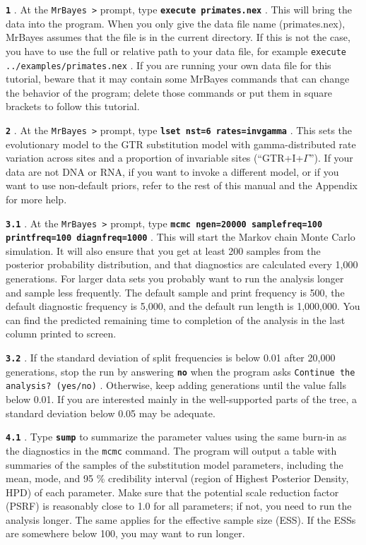 \documentclass[12pt]{book}
\newcommand{\ttt}[1]{\texttt{#1} }
\newcommand{\tb}[1]{\ttt{\textbf{#1}} }
\begin{document}
\tb{1}. At the \ttt{MrBayes >} prompt, type \tb{execute primates.nex}. This will bring
the data into the program. When you only give the data file name (primates.nex), MrBayes assumes
that the file is in the current directory. If this is not the case, you have to use the full or
relative path to your data file, for example \ttt{execute ../examples/primates.nex}. If you are
running your own data file for this tutorial, beware that it may contain some MrBayes commands that
can change the behavior of the program; delete those commands or put them in square brackets to
follow this tutorial. 

\tb{2}. At the \ttt{MrBayes >} prompt, type \tb{lset nst=6 rates=invgamma}. This sets
the evolutionary model to the GTR substitution model with gamma-distributed rate variation across
sites and a proportion of invariable sites (``GTR+I+$\Gamma$''). If your data are not DNA or RNA, if
you want to invoke a different model, or if you want to use non-default priors, refer to the rest
of this manual and the Appendix for more help.

\tb{3.1}. At the \ttt{MrBayes >} prompt, type \tb{mcmc ngen=20000 samplefreq=100
printfreq=100 diagnfreq=1000}. This will start the Markov chain Monte Carlo simulation. It will
also ensure that you get at least 200 samples from the posterior probability distribution, and that
diagnostics are calculated every 1,000 generations. For larger data sets you probably want to run
the analysis longer and sample less frequently. The default sample and print frequency is 500, the
default diagnostic frequency is 5,000, and the default run length is 1,000,000. You can find the
predicted remaining time to completion of the analysis in the last column printed to screen.

\tb{3.2}. If the standard deviation of split frequencies is below 0.01 after 20,000
generations, stop the run by answering \tb{no} when the program asks \ttt{Continue the
analysis? (yes/no)}.  Otherwise, keep adding generations until the value falls below 0.01. If you
are interested mainly in the well-supported parts of the tree, a standard deviation below 0.05 may
be adequate.

\tb{4.1}. Type \tb{sump} to summarize the parameter values using the same burn-in as the
diagnostics in the \ttt{mcmc} command. The program will output a table with summaries of the
samples of the substitution model parameters, including the mean, mode, and 95 \% credibility
interval (region of Highest Posterior Density, HPD) of each parameter. Make sure that the potential
scale reduction factor (PSRF) is reasonably close to 1.0 for all parameters; if not, you need to
run the analysis longer.  The same applies for the effective sample size (ESS). If the ESSs are
somewhere below 100, you may want to run longer.
\end{document}
